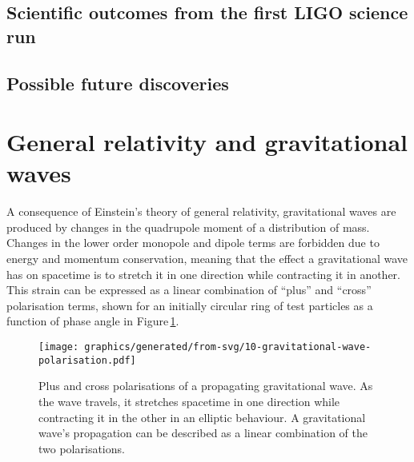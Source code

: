 \subsection{Scientific outcomes from the first LIGO science run}

\subsection{Possible future discoveries}

\section{General relativity and gravitational waves}
A consequence of Einstein's theory of general relativity, gravitational waves are produced by changes in the quadrupole moment of a distribution of mass. Changes in the lower order monopole and dipole terms are forbidden due to energy and momentum conservation, meaning that the effect a gravitational wave has on spacetime is to stretch it in one direction while contracting it in another. This strain can be expressed as a linear combination of ``plus'' and ``cross'' polarisation terms, shown for an initially circular ring of test particles as a function of phase angle in Figure\,\ref{fig:gravitational-wave-polarisation}.

\begin{figure}
  \centering
  \texttt{[image: graphics/generated/from-svg/10-gravitational-wave-polarisation.pdf]}
  \caption[Plus and cross polarisations of a propagating gravitational wave]{\label{fig:gravitational-wave-polarisation}Plus and cross polarisations of a propagating gravitational wave. As the wave travels, it stretches spacetime in one direction while contracting it in the other in an elliptic behaviour. A gravitational wave's propagation can be described as a linear combination of the two polarisations.}
\end{figure}

